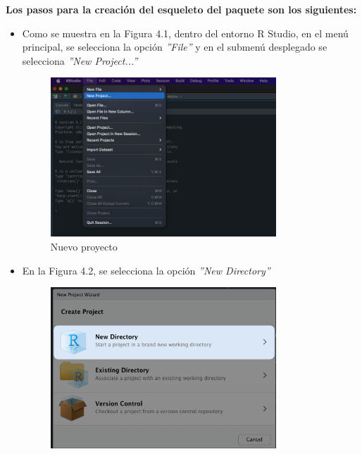 \noindent
\textbf{Los pasos para la creación del esqueleto del paquete son los siguientes:\\}

\begin{itemize}
    \item Como se muestra en la Figura 4.1, dentro del entorno R Studio, en el men\'u principal, se selecciona la opci\'on \textit{''File''} y en el submen\'u desplegado se selecciona \textit{''New Project...''}
    \begin{figure}[H]
        \centering
          \begin{minipage}{0.8\textwidth}
            \centering
            \includegraphics[width=0.8\textwidth]{figure_4_1.png}
            \caption{Nuevo proyecto}
            \label{fig:descripcion}
          \end{minipage}%
          \hspace{5mm}
    \end{figure}
    \item En la Figura 4.2, se selecciona la opci\'on \textit{''New Directory''}
    \begin{figure}[H]
        \centering
          \begin{minipage}{0.8\textwidth}
            \centering
            \includegraphics[width=0.8\textwidth]{figure_4_2.png}

\end{minipage}
\end{figure}
\end{itemize}
